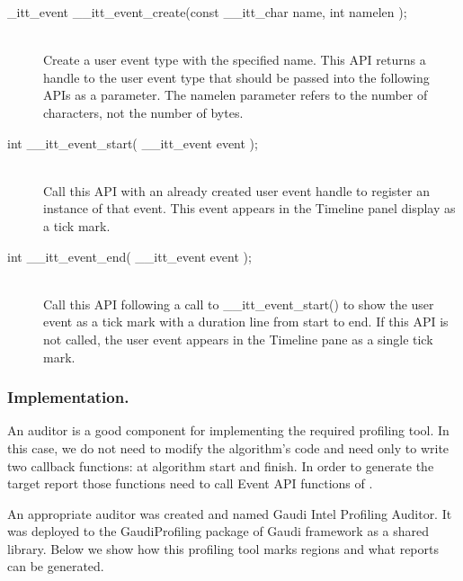 \documentclass[a4paper]{jpconf}
\begin{document}
\begin{description}
\item[\_itt\_event \_\_itt\_event\_create(const \_\_itt\_char \*name, int namelen );] \hfill \\
Create a user event type with the specified name. This API returns a handle to the user event type that should be 
passed into the following APIs as a parameter. The namelen parameter refers to the number of characters, 
not the number of bytes.

\item[int \_\_itt\_event\_start( \_\_itt\_event event );] \hfill \\
Call this API with an already created user event handle to register an instance of that event. This event appears 
in the Timeline panel display as a tick mark.

\item[int \_\_itt\_event\_end( \_\_itt\_event event );] \hfill \\
Call this API following a call to \_\_itt\_event\_start() to show the user event as a tick mark with a duration line 
from start to end. If this API is not called, the user event appears in the Timeline pane as a single tick mark.
\end{description}

\subsubsection{Implementation.}

An auditor is a good component for implementing the required profiling tool. In this case, we do not need to modify 
the algorithm’s code and need only to write two callback functions: at algorithm start and finish. In order to generate 
the target report those functions need to call Event API functions of \amp.

An appropriate auditor was created and named Gaudi Intel Profiling Auditor. It was deployed to the GaudiProfiling 
package of Gaudi framework as a shared library. Below we show how this profiling tool marks regions and what reports 
can be generated.
\end{document}
